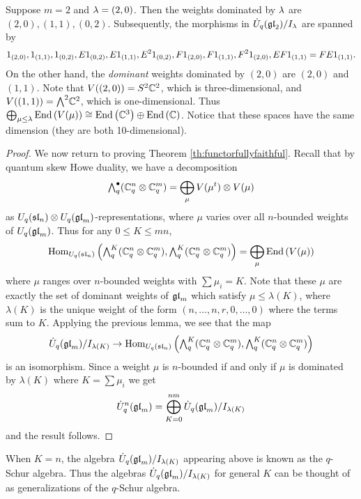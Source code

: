 \documentclass[11pt]{amsart}
\begin{document}
\begin{example}
Suppose $m=2$ and $\lambda = (2,0)$. Then the weights dominated by $\lambda$ are $(2,0), (1,1), (0,2)$. Subsequently,  the morphisms in $\dot{U}_q({\mathfrak{gl}}_2)/I_\lambda$ are spanned by
$$1_{(2,0)}, 1_{(1,1)}, 1_{(0,2)}, E 1_{(0,2)}, E 1_{(1,1)}, E^2 1_{(0,2)}, F 1_{(2,0)}, F1_{(1,1)}, F^2 1_{(2,0)}, EF1_{(1,1)} = FE1_{(1,1)}.$$
On the other hand, the \emph{dominant} weights dominated by $(2,0)$ are $(2,0)$ and $(1,1)$. Note that $V((2,0)) = S^2 {\mathbb{C}}^2 $, which is three-dimensional, and $V((1,1)) = {\textstyle\bigwedge^{2}_{}} {\mathbb{C}}^2 $, which is one-dimensional.  Thus $\bigoplus_{\mu \le \lambda} \operatorname{End}\left(V(\mu)\right) \cong \operatorname{End}\left({\mathbb{C}}^3\right) \oplus \operatorname{End}\left({\mathbb{C}}\right)$. Notice that these spaces have the same dimension (they are both 10-dimensional).
\end{example}

\begin{proof}
We now return to proving Theorem \ref{th:functorfullyfaithful}. Recall that by quantum skew Howe duality, we have a decomposition
$$ {\textstyle\bigwedge^{\bullet}_{q}} ({\mathbb{C}}_q^n \otimes {\mathbb{C}}_q^m) = \bigoplus_{\mu} V(\mu^t) \otimes V(\mu) $$
as $U_q({\mathfrak{sl}}_n) \otimes U_q({\mathfrak{gl}}_m)$-representations, where $\mu$ varies over all $n$-bounded weights of $U_q({\mathfrak{gl}}_m)$. Thus for any $ 0 \le K \le mn $,
$$ \operatorname{Hom}_{U_q({\mathfrak{sl}}_n)} \left({\textstyle\bigwedge^{K}_{q}}({\mathbb{C}}_q^n \otimes {\mathbb{C}}_q^m), {\textstyle\bigwedge^{K}_{q}}({\mathbb{C}}_q^n \otimes {\mathbb{C}}_q^m)\right) = \bigoplus_{\mu} \operatorname{End}\left(V(\mu)\right) $$
where $ \mu $ ranges over $ n$-bounded weights with $ \sum \mu_i = K $.  Note that these $\mu $ are exactly the set of dominant weights of $ {\mathfrak{gl}}_m $ which satisfy $ \mu \le \lambda(K) $, where $ \lambda(K) $ is the unique weight of the form $(n, \dots, n, r, 0, \dots, 0) $ where the terms sum to $K$.  Applying the previous lemma, we see that the map
$$ \dot{{U}}_q({\mathfrak{gl}}_m)/I_{\lambda(K)} \rightarrow \operatorname{Hom}_{U_q({\mathfrak{sl}}_n)} \left({\textstyle\bigwedge^{K}_{q}}({\mathbb{C}}_q^n \otimes {\mathbb{C}}_q^m), {\textstyle\bigwedge^{K}_{q}}({\mathbb{C}}_q^n \otimes {\mathbb{C}}_q^m)\right) $$
is an isomorphism. Since a weight $ \mu $ is $n$-bounded if and only if $ \mu $ is dominated by $ \lambda(K) $ where $ K = \sum \mu_i $ we get
$$ \dot{{U}}_q^n({\mathfrak{gl}}_m) = \bigoplus_{K=0}^{nm} \dot{{U}}_q({\mathfrak{gl}}_m)/I_{\lambda(K)} $$
and the result follows.
\end{proof}

\begin{rem}
When $ K = n $, the algebra $ \dot{{U}}_q({\mathfrak{gl}}_m)/I_{\lambda(K)} $ appearing above is known as the $q$-Schur algebra.  Thus the algebras $ \dot{{U}}_q({\mathfrak{gl}}_m)/I_{\lambda(K)} $ for general $ K $ can be thought of as generalizations of the $q$-Schur algebra.
\end{rem}
\end{document}
